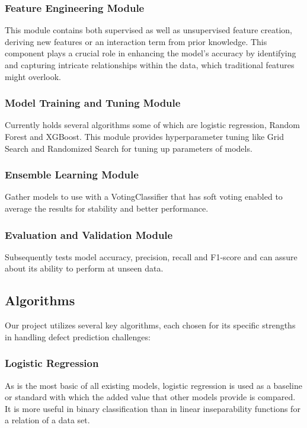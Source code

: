 \documentclass[conference]{IEEEtran}
\begin{document}
\subsubsection{Feature Engineering Module}
This module contains both supervised as well as unsupervised feature creation, deriving new features or an interaction term from prior knowledge. This component plays a crucial role in enhancing the model's accuracy by identifying and capturing intricate relationships within the data, which traditional features might overlook.

\subsubsection{Model Training and Tuning Module}
Currently holds several algorithms some of which are logistic regression, Random Forest and XGBoost. This module provides hyperparameter tuning like Grid Search and Randomized Search for tuning up parameters of models.

\subsubsection{Ensemble Learning Module}
Gather models to use with a VotingClassifier that has soft voting enabled to average the results for stability and better performance.

\subsubsection{Evaluation and Validation Module}
Subsequently tests model accuracy, precision, recall and F1-score and can assure about its ability to perform at unseen data.

\subsection{Algorithms}

Our project utilizes several key algorithms, each chosen for its specific strengths in handling defect prediction challenges: 

\subsubsection{Logistic Regression}
As is the most basic of all existing models, logistic regression is used as a baseline or standard with which the added value that other models provide is compared. It is more useful in binary classification than in linear inseparability functions for a relation of a data set.
\end{document}
